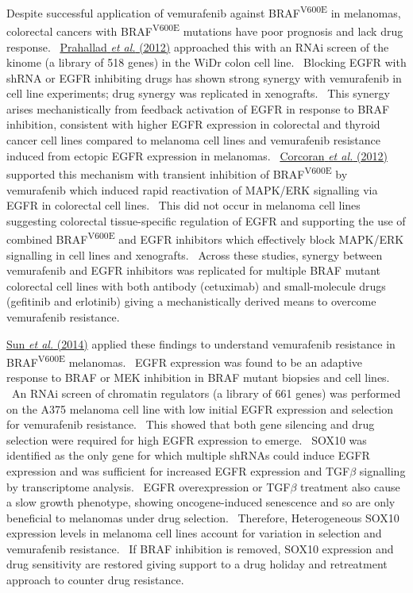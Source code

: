 Despite successful application of vemurafenib against BRAF\textsuperscript{V600E} in melanomas, colorectal cancers with BRAF\textsuperscript{V600E} mutations have poor prognosis and lack drug response. \ \hyperlink{ENREF80}{Prahallad}\hyperlink{ENREF80}{\textit{ et al.}}\hyperlink{ENREF80}{ (2012)} approached this with an RNAi screen of the kinome (a library of 518 genes) in the WiDr colon cell line. \ Blocking EGFR with shRNA or EGFR inhibiting drugs has shown strong synergy with vemurafenib in cell line experiments; drug synergy was replicated in xenografts. \ This synergy arises mechanistically from feedback activation of EGFR in response to BRAF inhibition, consistent with higher EGFR expression in colorectal and thyroid cancer cell lines compared to melanoma cell lines and vemurafenib resistance induced from ectopic EGFR expression in melanomas. \ \hyperlink{ENREF24}{Corcoran}\hyperlink{ENREF24}{\textit{ et al.}}\hyperlink{ENREF24}{ (2012)} supported this mechanism with transient inhibition of BRAF\textsuperscript{V600E} by vemurafenib which induced rapid reactivation of MAPK/ERK signalling via EGFR in colorectal cell lines. \ This did not occur in melanoma cell lines suggesting colorectal tissue-specific regulation of EGFR and supporting the use of combined BRAF\textsuperscript{V600E} and EGFR inhibitors which effectively block MAPK/ERK signalling in cell lines and xenografts. \ Across these studies, synergy between vemurafenib and EGFR inhibitors was replicated for multiple BRAF mutant colorectal cell lines with both antibody (cetuximab) and small-molecule drugs (gefitinib and erlotinib) giving a mechanistically derived means to overcome vemurafenib resistance. \  

\hyperlink{ENREF92}{Sun}\hyperlink{ENREF92}{\textit{ et al.}}\hyperlink{ENREF92}{ (2014)} applied these findings to understand vemurafenib resistance in BRAF\textsuperscript{V600E} melanomas. \ EGFR expression was found to be an adaptive response to BRAF or MEK inhibition in BRAF mutant biopsies and cell lines. \ An RNAi screen of chromatin regulators (a library of 661 genes) was performed on the A375 melanoma cell line with low initial EGFR expression and selection for vemurafenib resistance. \ This showed that both gene silencing and drug selection were required for high EGFR expression to emerge. \ SOX10 was identified as the only gene for which multiple shRNAs could induce EGFR expression and was sufficient for increased EGFR expression and TGF$\beta $ signalling by transcriptome analysis. \ EGFR overexpression or TGF$\beta $ treatment also cause a slow growth phenotype, showing oncogene-induced senescence and so are only beneficial to melanomas under drug selection. \ Therefore, Heterogeneous SOX10 expression levels in melanoma cell lines account for variation in selection and vemurafenib resistance. \ If BRAF inhibition is removed, SOX10 expression and drug sensitivity are restored giving support to a drug holiday and retreatment approach to counter drug resistance. \  

